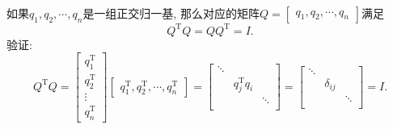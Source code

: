 如果$q_1,q_2,\cdots,q_n$是一组正交归一基, 那么对应的矩阵$Q = \begin{bmatrix} q_1, q_2, \cdots, q_n \end{bmatrix}$满足
\begin{equation}
  Q^{\mathrm{T}}Q = Q Q^{\mathrm{T}} = I.
\end{equation}
验证:
\begin{equation}
  Q^{\mathrm{T}}Q = \begin{bmatrix} 
  q^{\mathrm{T}}_1 \\ 
  q^{\mathrm{T}}_2 \\ 
  \vdots \\ 
  q^{\mathrm{T}}_n 
  \end{bmatrix}
  \begin{bmatrix} q^{\mathrm{T}}_1, q^{\mathrm{T}}_2, \cdots, q^{\mathrm{T}}_n \end{bmatrix}
  =
  \begin{bmatrix}
    \ddots & &\\
    &q^{\mathrm{T}}_j q_i & \\
    &  &\ddots \\
  \end{bmatrix}
  =
  \begin{bmatrix}
    \ddots &  & \\
    & \delta_{ij} & \\
    &  & \ddots\\
  \end{bmatrix}
  =
  I.
\end{equation}

